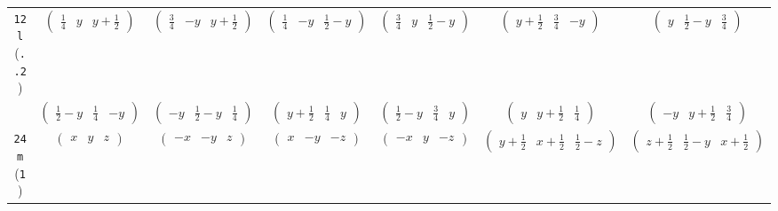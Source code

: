 \documentclass[fleqn,9pt,landscape]{jsarticle}
\begin{document}
\begin{center}
\begin{longtable}{ccccccc}
{\tt 12l} ({\tt ..2}) & $ \begin{pmatrix} \frac{1}{4} & y & y + \frac{1}{2} \end{pmatrix} $ & $ \begin{pmatrix} \frac{3}{4} & - y & y + \frac{1}{2} \end{pmatrix} $ & $ \begin{pmatrix} \frac{1}{4} & - y & \frac{1}{2} - y \end{pmatrix} $ & $ \begin{pmatrix} \frac{3}{4} & y & \frac{1}{2} - y \end{pmatrix} $ & $ \begin{pmatrix} y + \frac{1}{2} & \frac{3}{4} & - y \end{pmatrix} $ & $ \begin{pmatrix} y & \frac{1}{2} - y & \frac{3}{4} \end{pmatrix} $ \\
& $ \begin{pmatrix} \frac{1}{2} - y & \frac{1}{4} & - y \end{pmatrix} $ & $ \begin{pmatrix} - y & \frac{1}{2} - y & \frac{1}{4} \end{pmatrix} $ & $ \begin{pmatrix} y + \frac{1}{2} & \frac{1}{4} & y \end{pmatrix} $ & $ \begin{pmatrix} \frac{1}{2} - y & \frac{3}{4} & y \end{pmatrix} $ & $ \begin{pmatrix} y & y + \frac{1}{2} & \frac{1}{4} \end{pmatrix} $ & $ \begin{pmatrix} - y & y + \frac{1}{2} & \frac{3}{4} \end{pmatrix} $ \\ \hline
{\tt 24m} ({\tt 1}) & $ \begin{pmatrix} x & y & z \end{pmatrix} $ & $ \begin{pmatrix} - x & - y & z \end{pmatrix} $ & $ \begin{pmatrix} x & - y & - z \end{pmatrix} $ & $ \begin{pmatrix} - x & y & - z \end{pmatrix} $ & $ \begin{pmatrix} y + \frac{1}{2} & x + \frac{1}{2} & \frac{1}{2} - z \end{pmatrix} $ & $ \begin{pmatrix} z + \frac{1}{2} & \frac{1}{2} - y & x + \frac{1}{2} \end{pmatrix} $ \\

\end{longtable}
\end{center}
\end{document}
